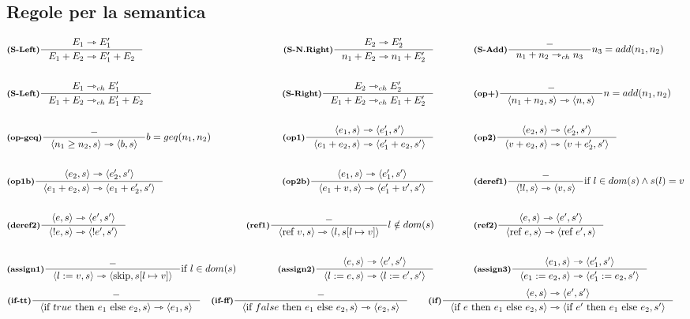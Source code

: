 \documentclass[a4paper, 10pt]{article}
\theoremstyle{definition}
\newcommand{\infer}[4]{\inference[\textbf{#1}]{#2}{#3}#4 }
\newcommand{\srule}[2]{\langle #1 \rangle \rightarrowtriangle \langle #2 \rangle}
\newcommand{\memrep}[3]{#1 \lbrack #2 \mapsto #3 \rbrack}
\newcommand{\goesto}{\rightarrowtriangle}
\begin{document}
\subsection*{Regole per la semantica}
	\begin{align*}
		&\infer{(S-Left)}{E_1 \goesto E_1' }{E_1 + E_2 \goesto E_1' + E_2}{} 
		&\infer{(S-N.Right)}{E_2 \goesto E_2'}{n_1 + E_2 \goesto n_1 + E_2'}{} \qquad\qquad
		&\infer{(S-Add)}{-}{n_1+n_2 \goesto_{ch} n_3}{n_3 = add(n_1, n_2)} \\ \\
		&\infer{(S-Left)}{E_1 \goesto_{ch} E_1'}{E_1 + E_2 \goesto_{ch} E_1' + E_2}{} 
		&\infer{(S-Right)}{E_2 \goesto_{ch} E_2'}{E_1 + E_2 \goesto_{ch} E_1 + E_2'}{} \qquad\qquad
		&\infer{(op+)}{-}{\srule{n_1 + n_2,s}{n,s}}{n=add(n_1,n_2)} \\ \\
		&\infer{(op-geq)}{-}{\srule{n_1 \geq n_2,s}{b,s}}{b=geq(n_1, n_2)} 
		&\infer{(op1)}{\srule{e_1,s}{e_1', s'}}{\srule{e_1 + e_2,s}{e_1' + e_2,s'}}{} \qquad\qquad
		&\infer{(op2)}{\srule{e_2,s}{e_2', s'}}{\srule{v + e_2,s}{v + e_2',s'}}{} \\ \\
		&\infer{(op1b)}{\srule{e_2,s}{e_2', s'}}{\srule{e_1 + e_2,s}{e_1 + e_2',s'}}{} 
		&\infer{(op2b)}{\srule{e_1,s}{e_1', s'}}{\srule{e_1 + v,s}{e_1' + v',s'}}{} \qquad\qquad
		&\infer{(deref1)}{-}{\srule{!l,s}{v,s}}{\text{if } l \in dom(s) \wedge s(l)=v} \\ \\
		&\infer{(deref2)}{\srule{e,s}{e',s'}}{\srule{!e,s}{!e',s'}}{} 
		&\infer{(ref1)}{-}{\srule{\text{ref }v, s}{l, \memrep{s}{l}{v}}}{l \notin dom(s)} \qquad\qquad
		&\infer{(ref2)}{\srule{e,s}{e',s'}}{\srule{\text{ref }e,s}{\text{ref } e',s}}{}\\ \\
		&\infer{(assign1)}{-}{\srule{l:=v,s}{\text{skip}, \memrep{s}{l}{v}}}{\text{if } l \in dom(s)} 
		&\infer{(assign2)}{\srule{e,s}{e',s'}}{\srule{l:=e,s}{l:=e',s'}}{} \qquad\qquad
		&\infer{(assign3)}{\srule{e_1,s}{e_1',s'}}{\srule{e_1:=e_2,s}{e_1':=e_2,s'}}{}
	\end{align*}
	\begin{align*}
		&\infer{(if-tt)}{-}{\srule{\text{if } true \text{ then } e_1 \text{ else } e_2,s}{e_1,s}}{}
		&\infer{(if-ff)}{-}{\srule{\text{if } false \text{ then } e_1 \text{ else } e_2,s}{e_2,s}}{}\qquad
		&\infer{(if)}{\srule{e,s}{e',s'}}{\srule{\text{if } e \text{ then } e_1 \text{ else } e_2,s}{\text{if } e' \text{ then } e_1 \text{ else } e_2,s'}}{}
	\end{align*}
\end{document}
